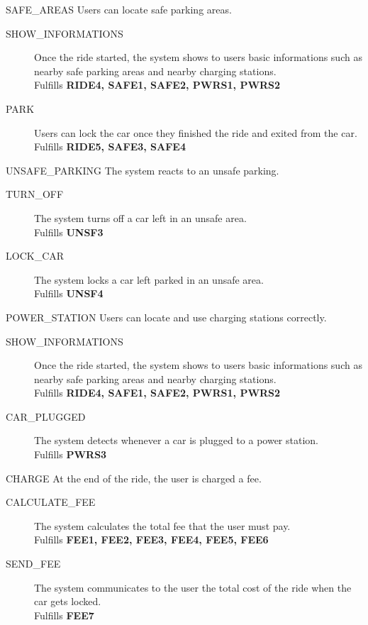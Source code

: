 \documentclass[11pt]{article} %
\begin{document}
	\item[SAFE\_AREAS] Users can locate safe parking areas. \hfill   {\color{red}{Overlaps with RIDE!}}
		\begin{description}
			\item[SHOW\_INFORMATIONS] Once the ride started, the system shows to users basic informations such as nearby safe parking areas and nearby charging stations. \\ Fulfills \textbf{RIDE4, SAFE1, SAFE2, PWRS1, PWRS2}
			\item[PARK] Users can lock the car once they finished the ride and exited from the car. \\ Fulfills \textbf{RIDE5, SAFE3, SAFE4}
		\end{description}

	\item[UNSAFE\_PARKING] The system reacts to an unsafe parking.\hfill {\color{red}{Missing UNSF1, UNSF2}}
		\begin{description}
			\item[TURN\_OFF] The system turns off a car left in an unsafe area. \\ Fulfills \textbf{UNSF3}
			\item[LOCK\_CAR] The system locks a car left parked in an unsafe area. \\ Fulfills \textbf{UNSF4}
		\end{description}

	\item[POWER\_STATION] Users can locate and use charging stations correctly. \hfill {\color{red}{Missing PWRS4}}
		\begin{description}
			\item[SHOW\_INFORMATIONS] Once the ride started, the system shows to users basic informations such as nearby safe parking areas and nearby charging stations. \\ Fulfills \textbf{RIDE4, SAFE1, SAFE2, PWRS1, PWRS2}
			\item[CAR\_PLUGGED] The system detects whenever a car is plugged to a power station. \\ Fulfills \textbf{PWRS3}
		\end{description}

	\item[CHARGE] At the end of the ride, the user is charged a fee.\hfill
		\begin{description}
			\item[CALCULATE\_FEE] The system calculates the total fee that the user must pay. \\ Fulfills \textbf{FEE1, FEE2, FEE3, FEE4, FEE5, FEE6}
			\item[SEND\_FEE] The system communicates to the user the total cost of the ride when the car gets locked. \\ Fulfills \textbf{FEE7}
		\end{description}
\end{document}
